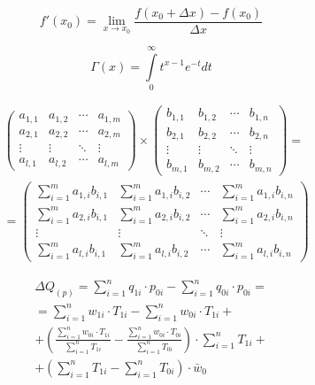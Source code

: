 \documentclass[12pt, a4paper]{article}
\begin{document}
\begin{equation}
\label{f3} 
f'(x_0)=\lim\limits_{x \to x_0}\frac{f\left(x_0+\Delta x\right)-f(x_0)}{\Delta x}\tag{\ae\ae\ae}
\end{equation}

\begin{equation}
\label{f4} 
\Gamma(x) = \int\limits_0^{\infty} t^{x-1} e^{-t} dt\tag{\ae\ae\ae\ae}
\end{equation}


\begin{align*}
\label{f5} 
&\begin{pmatrix}
  a_{1,1} & a_{1,2} & \cdots & a_{1,m} \\
  a_{2,1} & a_{2,2} & \cdots & a_{2,m} \\
  \vdots  & \vdots  & \ddots & \vdots  \\
  a_{l,1} & a_{l,2} & \cdots & a_{l,m}
 \end{pmatrix} \times \begin{pmatrix}
  b_{1,1} & b_{1,2} & \cdots & b_{1,n} \\
  b_{2,1} & b_{2,2} & \cdots & b_{2,n} \\
  \vdots  & \vdots  & \ddots & \vdots  \\
  b_{m,1} & b_{m,2} & \cdots & b_{m,n}
 \end{pmatrix}=\\
  & =\begin{pmatrix}
  \sum\limits_{i=1}^m a_{1,i}b_{i,1} & \sum\limits_{i=1}^m a_{1,i}b_{i,2} & \cdots & \sum\limits_{i=1}^m a_{1,i}b_{i,n} \\
  \sum\limits_{i=1}^m a_{2,i}b_{i,1} & \sum\limits_{i=1}^m a_{2,i}b_{i,2} & \cdots & \sum\limits_{i=1}^m a_{2,i}b_{i,n} \\
  \vdots  & \vdots  & \ddots & \vdots  \\
  \sum\limits_{i=1}^m a_{l,i}b_{i,1} & \sum\limits_{i=1}^m a_{l,i}b_{i,2} & \cdots & \sum\limits_{i=1}^m a_{l,i}b_{i,n} \end{pmatrix}\tag{\ae\ae\ae\ae\ae}
\end{align*}

\begin{multline*}
\label{f6} 
 \Delta Q_{(p)}=\sum\limits_{i=1}^n q_{1i}\cdot p_{0i} - \sum\limits_{i=1}^n q_{0i}\cdot p_{0i}=\\
  =\sum\limits_{i=1}^n w_{1i}\cdot T_{1i} - \sum\limits_{i=1}^n w_{0i}\cdot T_{1i}+\\
 +\left(\frac{\sum\limits_{i=1}^n w_{0i} \cdot T_{1i}}{\sum\limits_{i=1}^n T_{1i}} - \frac{\sum\limits_{i=1}^n w_{0i}\cdot T_{0i}}{\sum\limits_{i=1}^n T_{0i}}\right)\cdot\sum\limits_{i=1}^nT_{1i}+\\
 +\left(\sum\limits_{i=1}^n T_{1i} - \sum\limits_{i=1}^n T_{0i}\right)\cdot\bar w_0 \tag{\ae\ae\ae\ae\ae\ae}
 \end{multline*}
\end{document}
